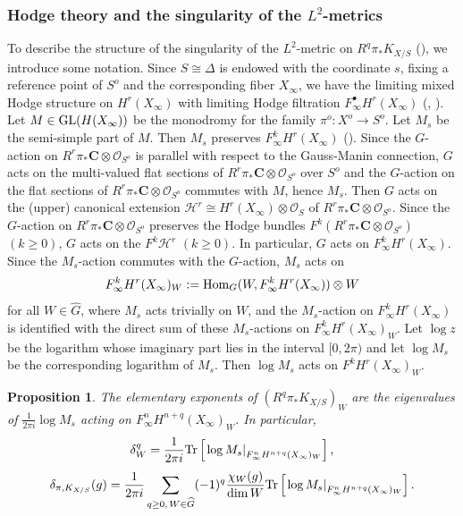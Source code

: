\documentclass[amscd, leqno]{amsart}
\theoremstyle{plain}
\newtheorem{proposition}[theorem]{Proposition}
\theoremstyle{definition}
\theoremstyle{remark}
\begin{document}
\subsubsection
{Hodge theory and the singularity of the $L^{2}$-metrics}
\label{sect:5.2.1}
To describe the structure of the singularity of the $L^{2}$-metric on $R^{q}\pi_{*}K_{X/S}$ (\cite[Prop.\,2.10]{EFM21}), 
we introduce some notation.
Since $S \cong \varDelta$ is endowed with the coordinate $s$, fixing a reference point of $S^{o}$ and the corresponding fiber $X_{\infty}$, 
we have the limiting mixed Hodge structure on $H^{r}(X_{\infty})$ with limiting Hodge filtration $F^{\bullet}_{\infty}H^{r}(X_{\infty})$ 
(\cite{Schmid73}, \cite{Steenbrink77}).
Let $M \in {\rm GL}(H(X_{\infty}))$ be the monodromy for the family $\pi^{o} \colon X^{o} \to S^{o}$. 
Let $M_{s}$ be the semi-simple part of $M$. Then $M_{s}$ preserves $F^{k}_{\infty}H^{r}(X_{\infty})$ (\cite[Th.\,2.13]{Steenbrink77}). 
Since the $G$-action on $R^{r}\pi_{*}{\mathbf C} \otimes {\mathcal O}_{S^{o}}$ is parallel with respect to the Gauss-Manin connection, 
$G$ acts on the multi-valued flat sections of $R^{r}\pi_{*}{\mathbf C} \otimes {\mathcal O}_{S^{o}}$ over $S^{o}$
and the $G$-action on the flat sections of $R^{r}\pi_{*}{\mathbf C} \otimes {\mathcal O}_{S^{o}}$ commutes with $M$, hence $M_{s}$. 
Then $G$ acts on the (upper) canonical extension ${\mathcal H}^{r} \cong H^{r}(X_{\infty})\otimes{\mathcal O}_{S}$ of 
$R^{r}\pi_{*}{\mathbf C} \otimes {\mathcal O}_{S^{o}}$. 
Since the $G$-action on $R^{r}\pi_{*}{\mathbf C} \otimes {\mathcal O}_{S^{o}}$ preserves the Hodge bundles 
$F^{k}(R^{r}\pi_{*}{\mathbf C} \otimes {\mathcal O}_{S^{o}})$ $(k\geq 0)$, $G$ acts on the $F^{k}{\mathcal H}^{r}$ $(k\geq 0)$. 
In particular, $G$ acts on $F^{k}_{\infty}H^{r}(X_{\infty})$. 
Since the $M_{s}$-action commutes with the $G$-action, $M_{s}$ acts on 
$$
F^{k}_{\infty}H^{r}(X_{\infty})_{W} := {\rm Hom}_{G}(W, F^{k}_{\infty}H^{r}(X_{\infty})) \otimes W
$$ 
for all $W \in \widehat{G}$, where $M_{s}$ acts trivially on $W$, and the $M_{s}$-action on $F^{k}_{\infty}H^{r}(X_{\infty})$ 
is identified with the direct sum of these $M_{s}$-actions on $F^{k}_{\infty}H^{r}(X_{\infty})_{W}$. 
Let $\log z$ be the logarithm whose imaginary part lies in the interval $[0, 2\pi)$ and 
let $\log M_{s}$ be the corresponding logarithm of $M_{s}$. Then $\log M_{s}$ acts on $F^{k}H^{r}(X_{\infty})_{W}$.


\begin{proposition}
\label{prop:EFM21}
The elementary exponents of $(R^{q}\pi_{*}K_{X/S})_{W}$ are the eigenvalues of $\frac{1}{2\pi i}\log M_{s}$ 
acting on $F^{n}_{\infty}H^{n+q}(X_{\infty})_{W}$. In particular,
$$
\delta_{W}^{q} = \frac{1}{2\pi i} {\rm Tr} \left[ \left. \log M_{s} \right|_{F^{n}_{\infty}H^{n+q}(X_{\infty})_{W}} \right],
$$
$$
\delta_{\pi, K_{X/S}}(g) =
\frac{1}{2\pi i} \sum_{q\geq 0,\,W \in \widehat{G}} (-1)^{q} \frac{\chi_{W}(g)}{\dim W}
{\rm Tr} \left[ \left. \log M_{s} \right|_{F^{n}_{\infty}H^{n+q}(X_{\infty})_{W}} \right].
$$
\end{proposition}
\end{document}
